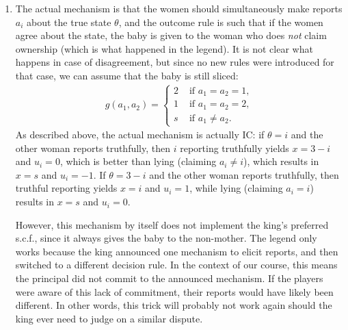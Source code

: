 \documentclass[a4paper]{article}
\begin{document}
\begin{enumerate}
	\item The actual mechanism is that the women should simultaneously make reports $a_i$ about the true state $\theta$, and the outcome rule is such that if the women agree about the state, the baby is given to the woman who does \emph{not} claim ownership (which is what happened in the legend). It is not clear what happens in case of disagreement, but since no new rules were introduced for that case, we can assume that the baby is still sliced:
	\begin{align*}
		g(a_1,a_2) = \begin{cases}
			2 & \text{ if } a_1=a_2=1, 
			\\
			1 & \text{ if } a_1=a_2=2, 
			\\
			s & \text{ if } a_1 \neq a_2. 
		\end{cases}
	\end{align*}
	As described above, the actual mechanism is actually IC: if $\theta = i$ and the other woman reports truthfully, then $i$ reporting truthfully yields $x=3-i$ and $u_i = 0$, which is better than lying (claiming $a_i \neq i$), which results in $x=s$ and $u_i=-1$. If $\theta = 3-i$ and the other woman reports truthfully, then truthful reporting yields $x=i$ and $u_i=1$, while lying (claiming $a_i = i$) results in $x=s$ and $u_i=0$.
	
	However, this mechanism by itself does not implement the king's preferred s.c.f., since it always gives the baby to the non-mother. The legend only works because the king announced one mechanism to elicit reports, and then switched to a different decision rule. In the context of our course, this means the principal did not commit to the announced mechanism. If the players were aware of this lack of commitment, their reports would have likely been different. In other words, this trick will probably not work again should the king ever need to judge on a similar dispute.
	

\end{enumerate}
\end{document}
